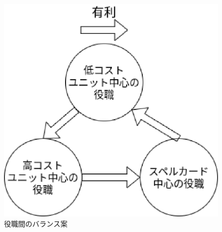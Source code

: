 \documentclass{jarticle}     %
\begin{document}
\begin{figure}[ht]
  \centering
  \includegraphics[width=120mm]{assets/deck.eps}
  \vspace{-0.3cm}
  \caption{役職間のバランス案}
  \label{fig:deck}
\end{figure}




\end{document}
